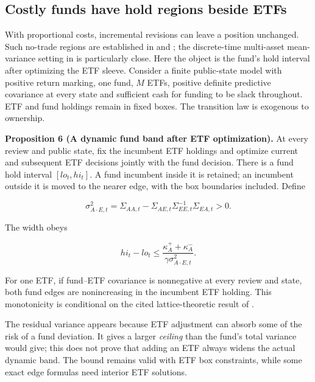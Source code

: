 \documentclass[11pt]{article}
\begin{document}
\subsection{Costly funds have hold regions beside ETFs}\label{sec:4.2}

With proportional costs, incremental revisions can leave a position unchanged. Such no-trade regions are established in \cite{constantinides1986capital} and \cite{davis1990portfolio}; the discrete-time multi-asset mean-variance setting in \cite{mei2016multiperiod} is particularly close. Here the object is the fund's hold interval after optimizing the ETF sleeve. Consider a finite public-state model with positive return marking, one fund, \(M\) ETFs, positive definite predictive covariance at every state and sufficient cash for funding to be slack throughout. ETF and fund holdings remain in fixed boxes. The transition law is exogenous to ownership.

\label{res:Proposition-6}
\textbf{Proposition 6 (A dynamic fund band after ETF optimization).} At every review and public state, fix the incumbent ETF holdings and optimize current and subsequent ETF decisions jointly with the fund decision. There is a fund hold interval \([lo_t,hi_t]\). A fund incumbent inside it is retained; an incumbent outside it is moved to the nearer edge, with the box boundaries included. Define

\begin{equation*}
\sigma^2_{A\cdot E,t}
=\Sigma_{AA,t}-\Sigma_{AE,t}\Sigma_{EE,t}^{-1}\Sigma_{EA,t}>0.
\tag{21}\label{eq:21}
\end{equation*}

The width obeys

\begin{equation*}
hi_t-lo_t\leq
\frac{\kappa_A^++\kappa_A^-}{\gamma\sigma^2_{A\cdot E,t}}.
\tag{22}\label{eq:22}
\end{equation*}

For one ETF, if fund--ETF covariance is nonnegative at every review and state, both fund edges are nonincreasing in the incumbent ETF holding. This monotonicity is conditional on the cited lattice-theoretic result of \cite{topkis1978minimizing}.

The residual variance appears because ETF adjustment can absorb some of the risk of a fund deviation. It gives a larger \emph{ceiling} than the fund's total variance would give; this does not prove that adding an ETF always widens the actual dynamic band. The bound remains valid with ETF box constraints, while some exact edge formulas need interior ETF solutions.
\end{document}
